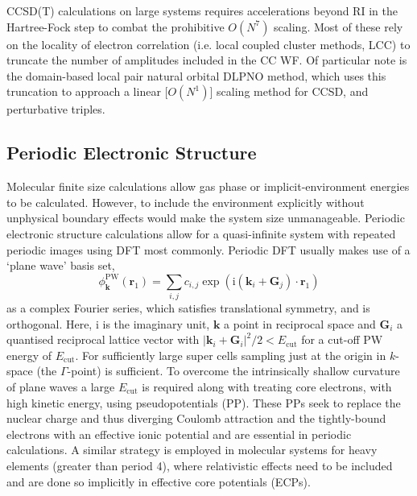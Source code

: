 \documentclass[main.tex]{subfiles}
\begin{document}

CCSD(T) calculations on large systems requires accelerations beyond RI in the Hartree-Fock step to combat the prohibitive $O(N^7)$ scaling. Most of these rely on the locality of electron correlation (i.e. local coupled cluster methods, LCC) to truncate the number of amplitudes included in the CC WF.\cite{Werner2011} Of particular note is the domain-based local pair natural orbital DLPNO method, which uses this truncation to approach a linear [$O(N^1)$] scaling method for CCSD,\cite{Riplinger2013} and perturbative triples.\cite{Yang2018}

\subsection{Periodic Electronic Structure}

Molecular finite size calculations allow gas phase or implicit-environment energies to be calculated. However, to include the environment explicitly without unphysical boundary effects would make the system size unmanageable. Periodic electronic structure calculations allow for a quasi-infinite system with repeated periodic images using DFT most commonly.\cite{Hasnip2014} Periodic DFT usually makes use of a `plane wave' basis set,
\begin{equation}
	\phi_{\boldsymbol{k}}^\text{PW}(\boldsymbol{r}_1) = \sum_{i, j} c_{i, j}\exp(\text{i}(\boldsymbol{k}_i + \boldsymbol{G}_j)\cdot \boldsymbol{r}_1)
\end{equation}
as a complex Fourier series, which satisfies translational symmetry, and is orthogonal. Here, $\text{i}$ is the imaginary unit, $\boldsymbol{k}$ a point in reciprocal space and $\boldsymbol{G}_i$ a quantised reciprocal lattice vector with $|\boldsymbol{k}_i + \boldsymbol{G}_i|^2/2 < E_\text{cut}$ for a cut-off PW energy of $E_\text{cut}$.\cite{DFTPracticalIntro2009} For sufficiently large super cells sampling just at the origin in $k$-space (the $\Gamma$-point) is sufficient.\cite{Kratzer2019}
 To overcome the intrinsically shallow curvature of plane waves a large $E_\text{cut}$ is required along with treating core electrons, with high kinetic energy, using pseudopotentials (PP). These PPs seek to replace the nuclear charge and thus diverging Coulomb attraction and the tightly-bound electrons with an effective ionic potential and are essential in periodic calculations. A similar strategy is employed in molecular systems for heavy elements (greater than period 4), where relativistic effects need to be included and are done so implicitly in effective core potentials (ECPs).
\end{document}

